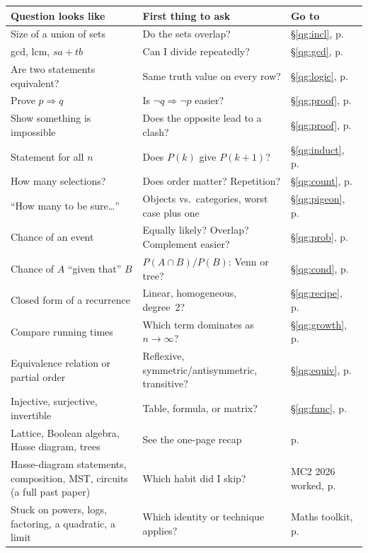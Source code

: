 \documentclass{fkt-notes}
\theoremstyle{definition}
\begin{document}
\begin{center}
  \small\renewcommand{\arraystretch}{1.2}
  \begin{tabular}{@{}p{}p{}p{}@{}}
    \toprule
    \textbf{Question looks like} & \textbf{First thing to ask} & \textbf{Go to} \\
    \midrule
    Size of a union of sets & Do the sets overlap? & \S\ref{qg:incl}, p.~\pageref{qg:incl} \\
    gcd, lcm, $sa+tb$ & Can I divide repeatedly? & \S\ref{qg:gcd}, p.~\pageref{qg:gcd} \\
    Are two statements equivalent? & Same truth value on every row? & \S\ref{qg:logic}, p.~\pageref{qg:logic} \\
    Prove $p\Rightarrow q$ & Is $\neg q\Rightarrow\neg p$ easier? & \S\ref{qg:proof}, p.~\pageref{qg:proof} \\
    Show something is impossible & Does the opposite lead to a clash? & \S\ref{qg:proof}, p.~\pageref{qg:proof} \\
    Statement for all $n$ & Does $P(k)$ give $P(k+1)$? & \S\ref{qg:induct}, p.~\pageref{qg:induct} \\
    How many selections? & Does order matter? Repetition? & \S\ref{qg:count}, p.~\pageref{qg:count} \\
    ``How many to be sure\ldots'' & Objects vs.\ categories, worst case plus one & \S\ref{qg:pigeon}, p.~\pageref{qg:pigeon} \\
    Chance of an event & Equally likely? Overlap? Complement easier? & \S\ref{qg:prob}, p.~\pageref{qg:prob} \\
    Chance of $A$ ``given that'' $B$ & $P(A\cap B)/P(B)$: Venn or tree? & \S\ref{qg:cond}, p.~\pageref{qg:cond} \\
    Closed form of a recurrence & Linear, homogeneous, degree~2? & \S\ref{qg:recipe}, p.~\pageref{qg:recipe} \\
    Compare running times & Which term dominates as $n\to\infty$? & \S\ref{qg:growth}, p.~\pageref{qg:growth} \\
    Equivalence relation or partial order & Reflexive, symmetric/antisymmetric, transitive? & \S\ref{qg:equiv}, p.~\pageref{qg:equiv} \\
    Injective, surjective, invertible & Table, formula, or matrix? & \S\ref{qg:func}, p.~\pageref{qg:func} \\
    Lattice, Boolean algebra, Hasse diagram, trees & See the one-page recap & p.~\pageref{sec:examreview} \\
    Hasse-diagram statements, composition, MST, circuits (a full past paper) & Which habit did I skip? & MC2 2026 worked, p.~\pageref{sec:mc2-2026} \\
    Stuck on powers, logs, factoring, a quadratic, a limit & Which identity or technique applies? & Maths toolkit, p.~\pageref{sec:toolkit} \\
    \bottomrule
  \end{tabular}
\end{center}
\end{document}
